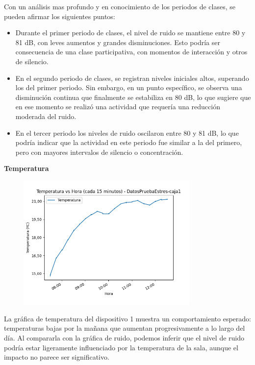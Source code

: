 \documentclass{templateNote}
\begin{document}
\begin{tcolorbox}
    Con un análisis mas profundo y en conocimiento de los periodos de clases, se pueden afirmar los siguientes puntos:
    \begin{itemize}
        \item Durante el primer periodo de clases, el nivel de ruido se mantiene entre 80 y 81 dB, con leves aumentos y grandes disminuciones. Esto podría ser consecuencia de una clase participativa, con momentos de interacción y otros de silencio.
        \item En el segundo periodo de clases, se registran niveles iniciales altos, superando los del primer periodo. Sin embargo, en un punto específico, se observa una disminución continua que finalmente se estabiliza en 80 dB, lo que sugiere que en ese momento se realizó una actividad que requería una reducción moderada del ruido.
        \item En el tercer periodo los niveles de ruido oscilaron entre 80 y 81 dB, lo que podría indicar que la actividad en este periodo fue similar a la del primero, pero con mayores intervalos de silencio o concentración.
    \end{itemize}    
\end{tcolorbox}


\newpage
\textbf{Temperatura}
\begin{figure}[H]
    \centering
    \includegraphics[width=0.8\textwidth]{img/DatosPruebaEstres-caja1_temperatura_vs_hora_15min.png}
\end{figure}

\begin{tcolorbox}
    La gráfica de temperatura del dispositivo 1 muestra un comportamiento esperado: temperaturas bajas por la mañana que aumentan progresivamente a lo largo del día. Al compararla con la gráfica de ruido, podemos inferir que el nivel de ruido podría estar ligeramente influenciado por la temperatura de la sala, aunque el impacto no parece ser significativo.
\end{tcolorbox}
\end{document}
